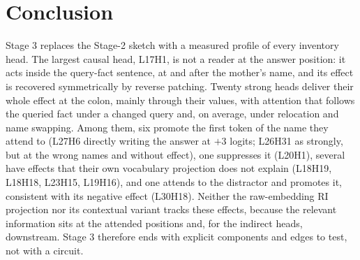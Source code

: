 \documentclass[11pt,a4paper]{article}
\begin{document}
\section{Conclusion}
Stage 3 replaces the Stage-2 sketch with a measured profile of every inventory head.
The largest causal head, L17H1, is not a reader at the answer position: it acts inside
the query-fact sentence, at and after the mother's name, and its effect is recovered
symmetrically by reverse patching. Twenty strong heads deliver their whole effect at
the colon, mainly through their values, with attention that follows the queried fact
under a changed query and, on average, under relocation and name swapping. Among them,
six promote the first token of the name they attend to (L27H6 directly writing the
answer at $+3$ logits; L26H31 as strongly, but at the wrong names and without effect),
one suppresses it (L20H1), several have effects that their own vocabulary projection
does not explain (L18H19, L18H18, L23H15, L19H16), and one attends to the distractor
and promotes it, consistent with its negative effect (L30H18). Neither the raw-embedding RI projection nor its
contextual variant tracks these effects, because the relevant information sits at the
attended positions and, for the indirect heads, downstream. Stage 3 therefore ends
with explicit components and edges to test, not with a circuit.
\end{document}
